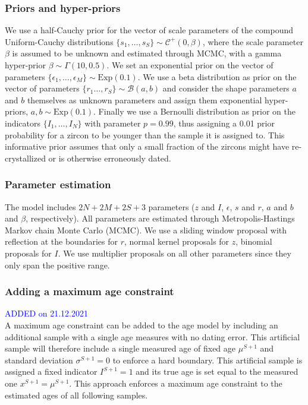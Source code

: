 \documentclass[12pt,letterpaper]{article}
\begin{document}
\subsubsection{Priors and hyper-priors}
We use a half-Cauchy prior for the vector of scale parameters of the compound Uniform-Cauchy distributions $\{s_1, \dots, s_S \} \sim \mathcal{C}^+(0, \beta)$, where the scale parameter $\beta$ is assumed to be unknown and estimated through MCMC, with a gamma hyper-prior $\beta \sim \Gamma(10, 0.5)$. 
We set an exponential prior on the vector of parameters $\{\epsilon_1, \dots, \epsilon_M \} \sim \text{Exp}(0.1)$.
We use a beta distribution as prior on the vector of parameters $\{r_1 \dots, r_S\} \sim \mathcal{B}(a, b)$ and consider the shape parameters $a$ and $b$ themselves as unknown parameters and assign them exponential hyper-priors, $a, b \sim \text{Exp}(0.1)$.
Finally we use a Bernoulli distribution as prior on the indicators $\{I_1, \dots, I_N\}$ with parameter $p = 0.99$, thus assigning a 0.01 prior probability for a zircon to be younger than the sample it is assigned to. This informative prior assumes that only a small fraction of the zircons might have re-crystallized or is otherwise erroneously dated. 

\subsubsection{Parameter estimation}
The model includes $2N + 2M + 2S + 3$ parameters ($z$ and $I$, $\epsilon$, $s$ and $r$, $a$ and $b$ and $\beta$, respectively). 
All parameters are estimated through Metropolis-Hastings Markov chain Monte Carlo (MCMC). We use a sliding window proposal with reflection at the boundaries for $r$, normal kernel proposals for $z$, binomial proposals for $I$. We use multiplier proposals on all other parameters since they only span the positive range. 


\subsubsection{Adding a maximum age constraint}
\textcolor{blue}{ADDED on 21.12.2021\\}
A maximum age constraint can be added to the age model by including an additional sample with a single age measures with no dating error. This artificial sample will therefore include a single measured age of fixed age $\mu^{S+1}$ and standard deviation $\sigma^{S+1} = 0$ to enforce a hard boundary. 
This artificial sample is assigned a fixed indicator $I^{S+1} = 1$ and its true age is set equal to the measured one $x^{S+1} = \mu^{S+1}$. 
This approach enforces a maximum age constraint to the estimated ages of all following samples. 
\end{document}
